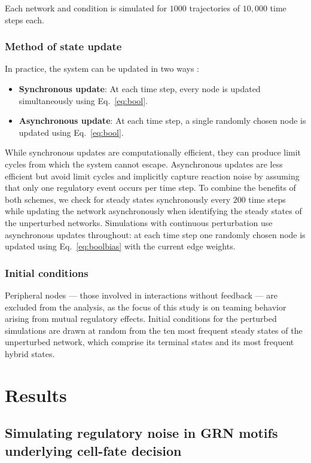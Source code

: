 \documentclass[11pt]{article}
\begin{document}
Each network and condition is simulated for $1000$ trajectories of $10{,}000$ time steps each.

\subsubsection{Method of state update}
In practice, the system can be updated in two ways \cite{garg2008synchronous, schwab2020concepts}:
\begin{itemize}
    \item \textbf{Synchronous update}: At each time step, every node is updated simultaneously using Eq.~\ref{eq:bool}.
    \item \textbf{Asynchronous update}: At each time step, a single randomly chosen node is updated using Eq.~\ref{eq:bool}.
\end{itemize}
While synchronous updates are computationally efficient, they can produce limit cycles from which the system cannot escape. Asynchronous updates are less efficient but avoid limit cycles and implicitly capture reaction noise by assuming that only one regulatory event occurs per time step. To combine the benefits of both schemes, we check for steady states synchronously every $200$ time steps while updating the network asynchronously when identifying the steady states of the unperturbed networks. Simulations with continuous perturbation use asynchronous updates throughout: at each time step one randomly chosen node is updated using Eq.~\ref{eq:boolbias} with the current edge weights.

\subsubsection{Initial conditions}

Peripheral nodes — those involved in interactions without feedback — are excluded from the analysis, as the focus of this study is on teaming behavior arising from mutual regulatory effects. Initial conditions for the perturbed simulations are drawn at random from the ten most frequent steady states of the unperturbed network, which comprise its terminal states and its most frequent hybrid states.


\section{Results}

\subsection{Simulating regulatory noise in GRN motifs underlying cell-fate decision}
\end{document}
